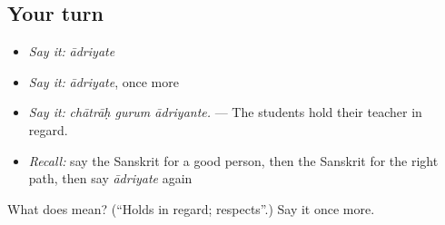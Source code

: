 \subsection*{Your turn}
\begin{itemize}
\raggedright
  \item \emph{Say it:} \emph{ādriyate}
  \item \emph{Say it:} \emph{ādriyate}, once more
  \item \emph{Say it:} \emph{chātrāḥ gurum ādriyante.} — The students hold their teacher in regard.
  \item \emph{Recall:} say the Sanskrit for a good person, then the Sanskrit for the right path, then say \emph{ādriyate} again
\end{itemize}

\begin{tcolorbox}[breakable,colback=teal!4,colframe=teal!35!black,title={Before you move on}]
What does  mean? (\textquotedblleft{}Holds in regard; respects\textquotedblright{}.) Say it once more.
\end{tcolorbox}
